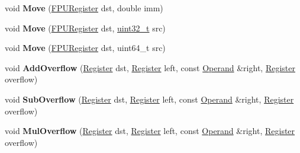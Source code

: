 \begin{DoxyCompactItemize}
\item 
\mbox{\label{classv8_1_1internal_1_1TurboAssembler_aa177479257c7a5e3750f31d15dfa9bcc}} 
void {\bfseries Move} (\mbox{\hyperlink{classv8_1_1internal_1_1FPURegister}{F\+P\+U\+Register}} dst, double imm)
\item 
\mbox{\label{classv8_1_1internal_1_1TurboAssembler_a654b8d2a7f5e47553f711ab3c9390f2c}} 
void {\bfseries Move} (\mbox{\hyperlink{classv8_1_1internal_1_1FPURegister}{F\+P\+U\+Register}} dst, \mbox{\hyperlink{classuint32__t}{uint32\+\_\+t}} src)
\item 
\mbox{\label{classv8_1_1internal_1_1TurboAssembler_a03d5f7e36c17ae5481bf4cf3f102ce7f}} 
void {\bfseries Move} (\mbox{\hyperlink{classv8_1_1internal_1_1FPURegister}{F\+P\+U\+Register}} dst, uint64\+\_\+t src)
\item 
\mbox{\label{classv8_1_1internal_1_1TurboAssembler_a507193bd8acc7ad62d73239e49b02d74}} 
void {\bfseries Add\+Overflow} (\mbox{\hyperlink{classv8_1_1internal_1_1Register}{Register}} dst, \mbox{\hyperlink{classv8_1_1internal_1_1Register}{Register}} left, const \mbox{\hyperlink{classv8_1_1internal_1_1Operand}{Operand}} \&right, \mbox{\hyperlink{classv8_1_1internal_1_1Register}{Register}} overflow)
\item 
\mbox{\label{classv8_1_1internal_1_1TurboAssembler_ae22aae8f907b15d2ae5d0e0653e766f2}} 
void {\bfseries Sub\+Overflow} (\mbox{\hyperlink{classv8_1_1internal_1_1Register}{Register}} dst, \mbox{\hyperlink{classv8_1_1internal_1_1Register}{Register}} left, const \mbox{\hyperlink{classv8_1_1internal_1_1Operand}{Operand}} \&right, \mbox{\hyperlink{classv8_1_1internal_1_1Register}{Register}} overflow)
\item 
\mbox{\label{classv8_1_1internal_1_1TurboAssembler_a0b3b6c02f6d8712d3d105673a86df808}} 
void {\bfseries Mul\+Overflow} (\mbox{\hyperlink{classv8_1_1internal_1_1Register}{Register}} dst, \mbox{\hyperlink{classv8_1_1internal_1_1Register}{Register}} left, const \mbox{\hyperlink{classv8_1_1internal_1_1Operand}{Operand}} \&right, \mbox{\hyperlink{classv8_1_1internal_1_1Register}{Register}} overflow)

\end{DoxyCompactItemize}
